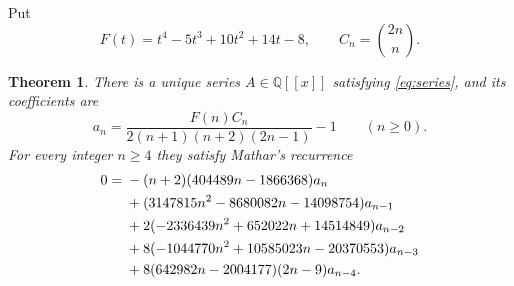 \documentclass[10pt]{article}
\newtheorem{theorem}{Theorem}
\begin{document}
Put
\[
 F(t)=t^4-5t^3+10t^2+14t-8,\qquad C_n=\binom{2n}{n}.
\]
\begin{theorem}\label{thm:main}
There is a unique series $A\in\mathbb Q[[x]]$ satisfying
\eqref{eq:series}, and its coefficients are
\begin{equation}
 a_n=\frac{F(n)C_n}{2(n+1)(n+2)(2n-1)}-1\qquad(n\geq0).\label{eq:closed}
\end{equation}
For every integer $n\geq4$ they satisfy Mathar's recurrence
\begin{align}
0={}&-(n+2)(404489n-1866368)a_n\notag\\
&+(3147815n^2-8680082n-14098754)a_{n-1}\notag\\
&+2(-2336439n^2+652022n+14514849)a_{n-2}\notag\\
&+8(-1044770n^2+10585023n-20370553)a_{n-3}\notag\\
&+8(642982n-2004177)(2n-9)a_{n-4}.\label{eq:recurrence}
\end{align}
\end{theorem}
\end{document}
